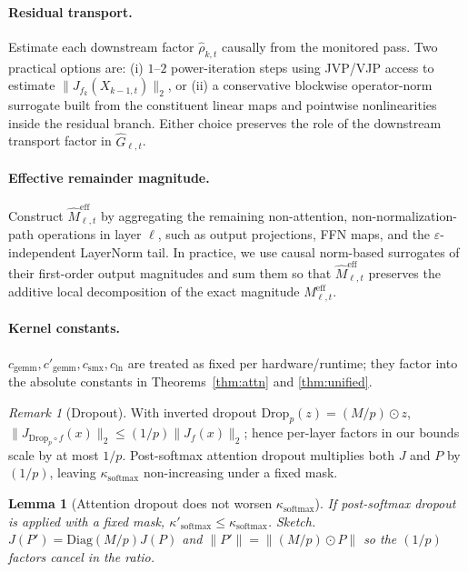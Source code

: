 \documentclass[twoside]{article}
\newtheorem{lemma}{Lemma}
\theoremstyle{definition}
\theoremstyle{remark}
\newtheorem{remark}{Remark}
\begin{document}
\paragraph{Residual transport.}
Estimate each downstream factor $\widehat{\rho}_{k,t}$ causally from the monitored
pass. Two practical options are: (i) $1$--$2$ power-iteration steps using JVP/VJP
access to estimate $\|J_{f_k}(X_{k-1,t})\|_2$, or (ii) a conservative blockwise
operator-norm surrogate built from the constituent linear maps and pointwise
nonlinearities inside the residual branch. Either choice preserves the role of
the downstream transport factor in $\widehat{G}_{\ell,t}$.

\paragraph{Effective remainder magnitude.}
Construct $\widehat{M}^{\mathrm{eff}}_{\ell,t}$ by aggregating the remaining
non-attention, non-normalization-path operations in layer $\ell$, such as output
projections, FFN maps, and the $\varepsilon$-independent LayerNorm tail. In
practice, we use causal norm-based surrogates of their first-order output
magnitudes and sum them so that $\widehat{M}^{\mathrm{eff}}_{\ell,t}$ preserves
the additive local decomposition of the exact magnitude $M^{\mathrm{eff}}_{\ell,t}$.

\paragraph{Kernel constants.}
$c_{\mathrm{gemm}},c'_{\mathrm{gemm}},c_{\mathrm{smx}},c_{\mathrm{ln}}$ are treated as fixed per hardware/runtime; they factor into the absolute constants in Theorems~\ref{thm:attn} and \ref{thm:unified}.

\begin{remark}[Dropout]\label{rem:dropout}
With inverted dropout $\mathrm{Drop}_p(z)=(M/p)\odot z$, 
$\|J_{\mathrm{Drop}_p\circ f}(x)\|_2\le (1/p)\|J_f(x)\|_2$; hence per-layer factors in our bounds
scale by at most $1/p$. Post-softmax attention dropout multiplies both $J$ and $P$ by $(1/p)$, 
leaving $\kappa_{\mathrm{softmax}}$ non-increasing under a fixed mask.
\end{remark}

\begin{lemma}[Attention dropout does not worsen $\kappa_{\mathrm{softmax}}$]
If post-softmax dropout is applied with a fixed mask, $\kappa'_{\mathrm{softmax}}\le \kappa_{\mathrm{softmax}}$.
\emph{Sketch.} $J(P')=\mathrm{Diag}(M/p)J(P)$ and $\|P'\|=\|(M/p)\odot P\|$ so the $(1/p)$ factors cancel in the ratio.
\end{lemma}
\end{document}
